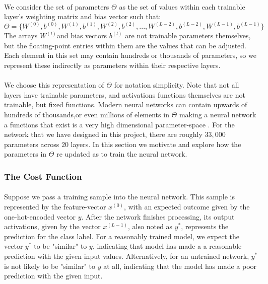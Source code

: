 \documentclass[12pt,letterpaper]{article}
\begin{document}
\paragraph*{}We consider the set of parameters $\Theta$ as the set of values within each trainable layer's weighting matrix and bias vector such that:
\begin{equation}
\label{eqn-Theta}
\Theta = \big\{
W^{(0)}, b^{(0)}, W^{(1)}, b^{(1)}, W^{(2)}, b^{(2)}, ... ,W^{(L-2)}, b^{(L-2)}, W^{(L-1)}, b^{(L-1)}
\big\}
\end{equation}
The arrays $W^{(l)}$and bias vectors $b^{(l)}$ are not trainable parameters themselves, but the floating-point entries within them are the values that can be adjusted. Each element in this set may contain hundreds or thousands of parameters, so we represent these indirectly as parameters within their respective layers. 

\paragraph*{}We choose this representation of $\Theta$ for notation simplicity. Note that not all layers have trainable parameters, and activations functions themselves are not trainable, but fixed functions. Modern neural networks can contain upwards of hundreds of thousands,or even millions of elements in $\Theta$ making a neural network a functions that exist is a very high dimensional parameter-space \cite{Geron,Goodfellow,Levine}. For the network that we have designed in this project, there are roughly $33,000$ parameters across $20$ layers. In this section we motivate and explore how the parameters in $\Theta$ re updated as to train the neural network.


\subsubsection{The Cost Function}

\paragraph*{}Suppose we pass a training sample into the neural network. This sample is represented by the feature-vector $x^{(0)}$, with an expected outcome given by the one-hot-encoded vector $y$.  After the network finishes processing, its output activations, given by the vector $x^{(L-1)}$, also noted as $y^*$, represents the prediction for the class label. For a reasonably trained model, we expect the vector $y^*$ to be "similar" to $y$, indicating that model has made a a reasonable prediction with the given input values. Alternatively, for an untrained network, $y^*$ is not likely to be "similar" to $y$ at all, indicating that the model has made a poor prediction with the given input.
\end{document}
